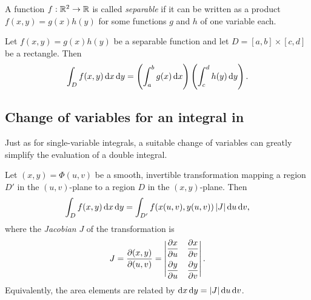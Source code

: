 \documentclass[a4paper]{article}
\begin{document}
\begin{defi}
  A function $f: \mathbb{R}^2 \to \mathbb{R}$ is called \emph{separable} if it can be written as a product $f(x, y) = g(x) h(y)$ for some functions $g$ and $h$ of one variable each.
\end{defi}

\begin{prop}
  Let $f(x, y) = g(x) h(y)$ be a separable function and let $D = [a, b] \times [c, d]$ be a rectangle. Then
  \[
    \int_D f(x, y) \, \mathrm{d} x \, \mathrm{d} y = \left( \int_a^b g(x) \, \mathrm{d} x \right) \left( \int_c^d h(y) \, \mathrm{d} y \right).
  \]
\end{prop}

\subsection{Change of variables for an integral in }
Just as for single-variable integrals, a suitable change of variables can greatly simplify the evaluation of a double integral.

\begin{thm}
  Let $(x, y) = \Phi(u, v)$ be a smooth, invertible transformation mapping a region $D'$ in the $(u, v)$-plane to a region $D$ in the $(x, y)$-plane. Then
  \[
    \int_D f(x, y) \, \mathrm{d} x \, \mathrm{d} y = \int_{D'} f(x(u, v), y(u, v)) \, |J| \, \mathrm{d} u \, \mathrm{d} v,
  \]
  where the \emph{Jacobian} $J$ of the transformation is
  \[
    J = \frac{\partial(x, y)}{\partial(u, v)} =
    \begin{vmatrix}
      \dfrac{\partial x}{\partial u} & \dfrac{\partial x}{\partial v} \vspace{5pt}\\
      \dfrac{\partial y}{\partial u} & \dfrac{\partial y}{\partial v}
    \end{vmatrix}.
  \]
  Equivalently, the area elements are related by $\mathrm{d} x \, \mathrm{d} y = |J| \, \mathrm{d} u \, \mathrm{d} v$.
\end{thm}
\end{document}
